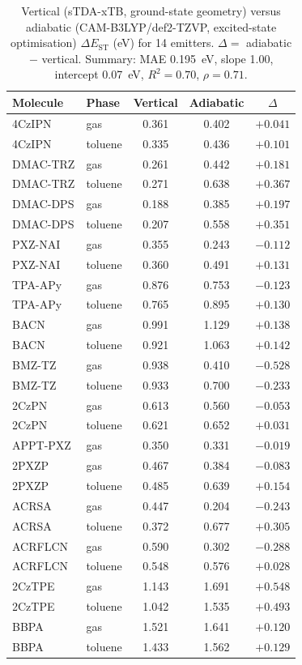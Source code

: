 \documentclass[final,3p,times,twocolumn]{elsarticle}
\begin{document}
\begin{table}[htbp]
  \centering
  \caption{Vertical (sTDA-xTB, ground-state geometry) versus adiabatic
    (CAM-B3LYP/def2-TZVP, excited-state optimisation) $\Delta E_\text{ST}$ (eV) for
    \num{14} emitters. $\Delta = $ adiabatic $-$ vertical. Summary: MAE
    \qty{0.195}{\electronvolt}, slope \num{1.00}, intercept \qty{0.07}{\electronvolt},
    $R^2 = 0.70$, $\rho = 0.71$.}
  \label{tab:adiabatic}
  \footnotesize
  \begin{tabular}{llccc}
    \toprule
    Molecule & Phase & Vertical & Adiabatic & $\Delta$ \\
    \midrule
    4CzIPN & gas & 0.361 & 0.402 & $+0.041$ \\
    4CzIPN & toluene & 0.335 & 0.436 & $+0.101$ \\
    DMAC-TRZ & gas & 0.261 & 0.442 & $+0.181$ \\
    DMAC-TRZ & toluene & 0.271 & 0.638 & $+0.367$ \\
    DMAC-DPS & gas & 0.188 & 0.385 & $+0.197$ \\
    DMAC-DPS & toluene & 0.207 & 0.558 & $+0.351$ \\
    PXZ-NAI & gas & 0.355 & 0.243 & $-0.112$ \\
    PXZ-NAI & toluene & 0.360 & 0.491 & $+0.131$ \\
    TPA-APy & gas & 0.876 & 0.753 & $-0.123$ \\
    TPA-APy & toluene & 0.765 & 0.895 & $+0.130$ \\
    BACN & gas & 0.991 & 1.129 & $+0.138$ \\
    BACN & toluene & 0.921 & 1.063 & $+0.142$ \\
    BMZ-TZ & gas & 0.938 & 0.410 & $-0.528$ \\
    BMZ-TZ & toluene & 0.933 & 0.700 & $-0.233$ \\
    2CzPN & gas & 0.613 & 0.560 & $-0.053$ \\
    2CzPN & toluene & 0.621 & 0.652 & $+0.031$ \\
    APPT-PXZ & gas & 0.350 & 0.331 & $-0.019$ \\
    2PXZP & gas & 0.467 & 0.384 & $-0.083$ \\
    2PXZP & toluene & 0.485 & 0.639 & $+0.154$ \\
    ACRSA & gas & 0.447 & 0.204 & $-0.243$ \\
    ACRSA & toluene & 0.372 & 0.677 & $+0.305$ \\
    ACRFLCN & gas & 0.590 & 0.302 & $-0.288$ \\
    ACRFLCN & toluene & 0.548 & 0.576 & $+0.028$ \\
    2CzTPE & gas & 1.143 & 1.691 & $+0.548$ \\
    2CzTPE & toluene & 1.042 & 1.535 & $+0.493$ \\
    BBPA & gas & 1.521 & 1.641 & $+0.120$ \\
    BBPA & toluene & 1.433 & 1.562 & $+0.129$ \\
    \bottomrule
  \end{tabular}
\end{table}
\end{document}
